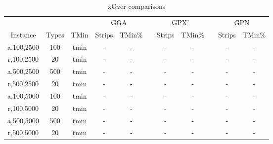 \documentclass{elsarticle}
\begin{document}
\begin{table}[h!]
	\centering
	\caption{xOver comparisons}
	\begin{tabular}{ccccccccccc}\toprule
		& & &\multicolumn{2}{c}{GGA} &\phantom{a}& \multicolumn{2}{c}{GPX'} &\phantom{a}& \multicolumn{2}{c}{GPN}\\
		\cmidrule{4-5} \cmidrule{7-8} \cmidrule{10-11}
		Instance & Types &TMin & Strips & TMin$\%$ && Strips & TMin$\%$ && Strips & TMin$\%$ \\ \midrule	
		a,100,2500 & 100 & tmin & - & - && - & - && - & -\\
		r,100,2500 & 20 & tmin & - & - && - & - && - & -\\
		\midrule
		a,500,2500 & 500 & tmin & - & - && - & - && - & -\\
		r,500,2500 & 20 & tmin & - & - && - & - && - & -\\
		\midrule
		\midrule
		a,100,5000 & 100 & tmin & - & - && - & - && - & -\\
		r,100,5000 & 20 & tmin & - & - && - & - && - & -\\
		\midrule
		a,500,5000 & 500 & tmin & - & - && - & - && - & -\\
		r,500,5000 & 20 & tmin & - & - && - & - && - & -\\
		\bottomrule
	\end{tabular}	
	\label{table:EA}
\end{table}
\end{document}
